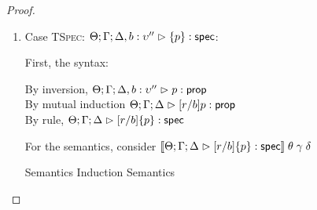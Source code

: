 \begin{proof}
\begin{enumerate}
  For semantics, consider $\interp{\judgeS[\Theta; \Gamma; \Delta]{[r/b](S \oplus S')}}\;\theta\;\gamma\;\delta$
  \begin{eqnproof}
    {Semantics}
    {Induction}
          {Semantics}
  \end{eqnproof}

\item Case \textsc{TSpec}: $\judgeS[\Theta; \Gamma; \Delta, b:\upsilon'']{\setof{p}}$:
  
  First, the syntax:
  \begin{tabbedproof}
    \oo By inversion, $\judgeA[\Theta; \Gamma; \Delta, b:\upsilon'']{p}{\assert}$ \\
    \oo By mutual induction $\judgeA[\Theta; \Gamma; \Delta]{[r/b]p}{\assert}$\\
    \oo By rule, $\judgeS[\Theta; \Gamma; \Delta]{[r/b]\setof{p}}$
  \end{tabbedproof}

  For the semantics, consider $\interp{\judgeS[\Theta; \Gamma; \Delta]{[r/b]\setof{p}}}\;\theta\;\gamma\;\delta$ 
  \begin{eqnproof}
          {Semantics}
          {Induction}
          {Semantics}
  \end{eqnproof}

\end{enumerate}

\end{proof}




